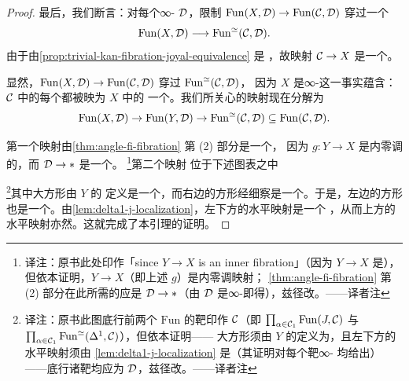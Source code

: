 \begin{proof}
最后，我们断言：对每个∞-\trCategory{} $\mathcal{D}$，限制\trFunctor{}%
$\mathrm{Fun}(X, \mathcal{D}) \to \mathrm{Fun}(\mathcal{C}, \mathcal{D})$ 穿过一个\trTrivialFibration{}%
\[
\mathrm{Fun}(X, \mathcal{D}) \longrightarrow \mathrm{Fun}^{\simeq}(\mathcal{C}, \mathcal{D}).
\]
由于\trTrivialFibration{}由\cref{prop:trivial-kan-fibration-joyal-equivalence} 是%
\trJoyalEquivalence{}，故映射 $\mathcal{C} \to X$ 是一个\trLocalization{}。

显然，$\mathrm{Fun}(X, \mathcal{D}) \to \mathrm{Fun}(\mathcal{C}, \mathcal{D})$ 穿过 $\mathrm{Fun}^{\simeq}(\mathcal{C}, \mathcal{D})$，
因为 $X$ 是∞-\trGroupoid{}这一事实蕴含：$\mathcal{C}$ 中的每个\trMorphism{}都被映为 $X$ 中的
一个\trEquivalence{}。我们所关心的映射现在分解为
\[
\mathrm{Fun}(X, \mathcal{D}) \to \mathrm{Fun}(Y, \mathcal{D}) \to
\mathrm{Fun}^{\simeq}(\mathcal{C}, \mathcal{D}) \subseteq \mathrm{Fun}(\mathcal{C}, \mathcal{D}).
\]

第一个映射由\cref{thm:angle-fi-fibration} 第 (2) 部分是一个\trTrivialFibration{}，
因为 $g\colon Y \to X$ 是内零调的，而 $\mathcal{D} \to \ast$ 是一个\trInnerFibration{}。%
\footnote{译注：原书此处印作「since $Y \to X$ is an inner fibration」（因为
$Y \to X$ 是\trInnerFibration{}），但依本证明，$Y \to X$（即上述 $g$）是内零调映射；
\cref{thm:angle-fi-fibration} 第 (2) 部分在此所需的\trInnerFibration{}应是
$\mathcal{D} \to \ast$（由 $\mathcal{D}$ 是∞-\trCategory{}即得），兹径改。——译者注}第二个映射
位于下述图表之中
\begin{center}
\end{center}
\footnote{译注：原书此图底行前两个 $\mathrm{Fun}$ 的靶印作 $\mathcal{C}$（即
$\prod_{\alpha \in \mathcal{C}_1}\mathrm{Fun}(J,\mathcal{C})$ 与
$\prod_{\alpha \in \mathcal{C}_1}\mathrm{Fun}^{\simeq}(\Delta^1,\mathcal{C})$），但依本证明——
大方形须由 $Y$ 的\trPushout{}定义为\trPullback{}，且左下方的水平映射须由%
\cref{lem:delta1-j-localization} 是\trTrivialFibration{}（其证明对每个靶∞-\trCategory{}%
均给出\trTrivialFibration{}）——底行诸靶均应为 $\mathcal{D}$，兹径改。——译者注}其中大方形由 $Y$ 的
定义是一个\trPullback{}，而右边的方形经细察是一个\trPullback{}。于是，左边的方形
也是一个\trPullback{}。由\cref{lem:delta1-j-localization}，左下方的水平映射是一个%
\trTrivialFibration{}，从而上方的水平映射亦然。这就完成了本引理的证明。
\end{proof}

